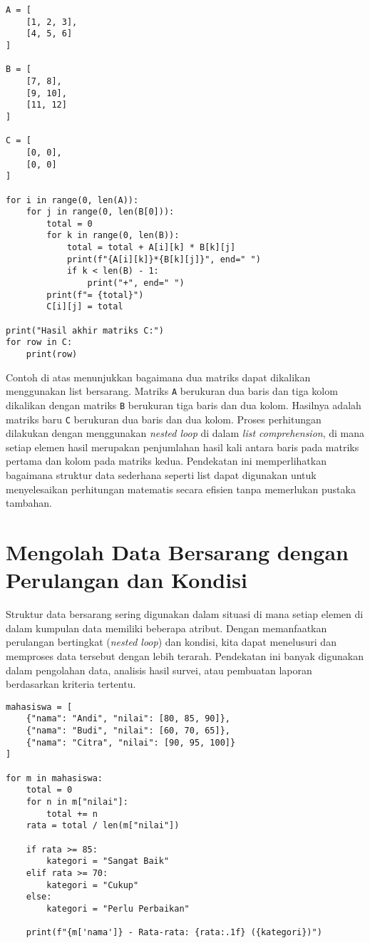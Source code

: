 \begin{lstlisting}[style=PythonStyle]
A = [
    [1, 2, 3],
    [4, 5, 6]
]

B = [
    [7, 8],
    [9, 10],
    [11, 12]
]

C = [
    [0, 0],
    [0, 0]
]

for i in range(0, len(A)):
    for j in range(0, len(B[0])):
        total = 0
        for k in range(0, len(B)):
            total = total + A[i][k] * B[k][j]
            print(f"{A[i][k]}*{B[k][j]}", end=" ")
            if k < len(B) - 1:
                print("+", end=" ")
        print(f"= {total}")
        C[i][j] = total

print("Hasil akhir matriks C:")
for row in C:
    print(row)
\end{lstlisting}

Contoh di atas menunjukkan bagaimana dua matriks dapat dikalikan menggunakan list bersarang. 
Matriks \texttt{A} berukuran dua baris dan tiga kolom dikalikan dengan matriks \texttt{B} berukuran tiga baris dan dua kolom. 
Hasilnya adalah matriks baru \texttt{C} berukuran dua baris dan dua kolom. 
Proses perhitungan dilakukan dengan menggunakan \textit{nested loop} di dalam \textit{list comprehension}, 
di mana setiap elemen hasil merupakan penjumlahan hasil kali antara baris pada matriks pertama dan kolom pada matriks kedua. 
Pendekatan ini memperlihatkan bagaimana struktur data sederhana seperti list dapat digunakan untuk menyelesaikan perhitungan matematis secara efisien tanpa memerlukan pustaka tambahan.

\section{Mengolah Data Bersarang dengan Perulangan dan Kondisi}
Struktur data bersarang sering digunakan dalam situasi di mana setiap elemen di dalam kumpulan data memiliki beberapa atribut. 
Dengan memanfaatkan perulangan bertingkat (\textit{nested loop}) dan kondisi, kita dapat menelusuri dan memproses data tersebut dengan lebih terarah. 
Pendekatan ini banyak digunakan dalam pengolahan data, analisis hasil survei, atau pembuatan laporan berdasarkan kriteria tertentu.

\begin{lstlisting}[style=PythonStyle]
mahasiswa = [
    {"nama": "Andi", "nilai": [80, 85, 90]},
    {"nama": "Budi", "nilai": [60, 70, 65]},
    {"nama": "Citra", "nilai": [90, 95, 100]}
]

for m in mahasiswa:
    total = 0
    for n in m["nilai"]:
        total += n
    rata = total / len(m["nilai"])
    
    if rata >= 85:
        kategori = "Sangat Baik"
    elif rata >= 70:
        kategori = "Cukup"
    else:
        kategori = "Perlu Perbaikan"
    
    print(f"{m['nama']} - Rata-rata: {rata:.1f} ({kategori})")
\end{lstlisting}

